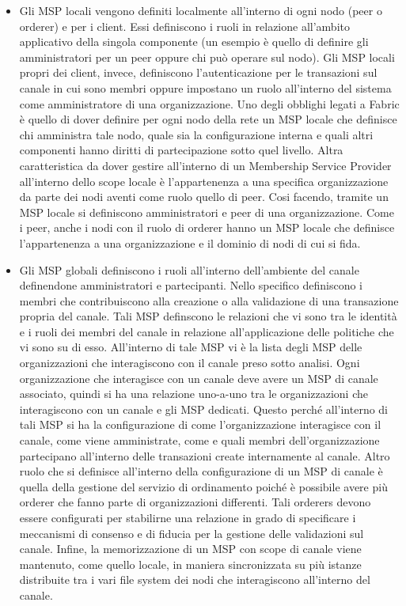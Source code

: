 \begin{itemize}
    \item Gli MSP locali vengono definiti localmente all'interno di ogni nodo (peer o orderer) e per i client. Essi definiscono i ruoli in relazione all'ambito applicativo della singola componente (un esempio è quello di definire gli amministratori per un peer oppure chi può operare sul nodo). Gli MSP locali propri dei client, invece, definiscono l'autenticazione per le transazioni sul canale in cui sono membri oppure impostano un ruolo all'interno del sistema come amministratore di una organizzazione. Uno degli obblighi legati a Fabric è quello di dover definire per ogni nodo della rete un MSP locale che definisce chi amministra tale nodo, quale sia la configurazione interna e quali altri componenti hanno diritti di partecipazione sotto quel livello. Altra caratteristica da dover gestire all'interno di un Membership Service Provider all'interno dello scope locale è l'appartenenza a una specifica organizzazione da parte dei nodi aventi come ruolo quello di peer. Cosi facendo, tramite un MSP locale si definiscono amministratori e peer di una organizzazione. Come i peer, anche i nodi con il ruolo di orderer hanno un MSP locale che definisce l'appartenenza a una organizzazione e il dominio di nodi di cui si fida.
    \item Gli MSP globali definiscono i ruoli all'interno dell'ambiente del canale definendone amministratori e partecipanti. Nello specifico definiscono i membri che contribuiscono alla creazione o alla validazione di una transazione propria del canale. Tali MSP definscono le relazioni che vi sono tra le identità e i ruoli dei membri del canale in relazione all'applicazione delle politiche che vi sono su di esso. All'interno di tale MSP vi è la lista degli MSP delle organizzazioni che interagiscono con il canale preso sotto analisi. Ogni organizzazione che interagisce con un canale deve avere un MSP di canale associato, quindi si ha una relazione uno-a-uno tra le organizzazioni che interagiscono con un canale e gli MSP dedicati. Questo perché all'interno di tali MSP si ha la configurazione di come l'organizzazione interagisce con il canale, come viene amministrate, come e quali membri dell'organizzazione partecipano all'interno delle transazioni create internamente al canale. Altro ruolo che si definisce all'interno della configurazione di un MSP di canale è quella della gestione del servizio di ordinamento poiché è possibile avere più orderer che fanno parte di organizzazioni differenti. Tali orderers devono essere configurati per stabilirne una relazione in grado di specificare i meccanismi di consenso e di fiducia per la gestione delle validazioni sul canale. Infine, la memorizzazione di un MSP con scope di canale viene mantenuto, come quello locale, in maniera sincronizzata su più istanze distribuite tra i vari file system dei nodi che interagiscono all'interno del canale.
\end{itemize}
